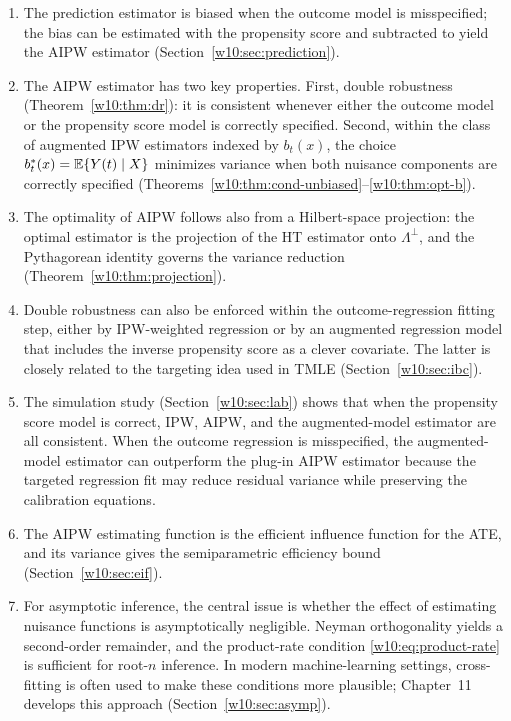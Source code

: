\documentclass[master.tex]{subfiles}
\begin{document}
\begin{enumerate}
  \item The prediction estimator is biased when the outcome model is
    misspecified; the bias can be estimated with the propensity score
    and subtracted to yield the AIPW estimator
    (Section~\ref{w10:sec:prediction}).
  \item The AIPW estimator has two key properties.  First, double
    robustness (Theorem~\ref{w10:thm:dr}): it is consistent whenever
    either the outcome model or the propensity score model is correctly
    specified.  Second, within the class of augmented IPW estimators
    indexed by $b_t(x)$, the choice $b_t^*(x)=\mathbb{E}\{Y(t)\mid X\}$
    minimizes variance when both nuisance components are correctly
    specified (Theorems~\ref{w10:thm:cond-unbiased}--\ref{w10:thm:opt-b}).
  \item The optimality of AIPW follows also from a Hilbert-space
    projection: the optimal estimator is the projection of the HT
    estimator onto $\Lambda^\perp$, and the Pythagorean identity
    governs the variance reduction (Theorem~\ref{w10:thm:projection}).
  \item Double robustness can also be enforced within the
    outcome-regression fitting step, either by IPW-weighted regression
    or by an augmented regression model that includes the inverse
    propensity score as a clever covariate.  The latter is closely
    related to the targeting idea used in TMLE
    \citep{vanderLaan2006targeted} (Section~\ref{w10:sec:ibc}).
  \item The simulation study (Section~\ref{w10:sec:lab}) shows that
    when the propensity score model is correct, IPW, AIPW, and the
    augmented-model estimator are all consistent.  When the outcome
    regression is misspecified, the augmented-model estimator can
    outperform the plug-in AIPW estimator because the targeted
    regression fit may reduce residual variance while preserving the
    calibration equations.
  \item The AIPW estimating function is the efficient influence
    function for the ATE, and its variance gives the semiparametric
    efficiency bound (Section~\ref{w10:sec:eif}).
  \item For asymptotic inference, the central issue is whether the
    effect of estimating nuisance functions is asymptotically
    negligible.  Neyman orthogonality yields a second-order remainder,
    and the product-rate condition \eqref{w10:eq:product-rate} is
    sufficient for root-$n$ inference.  In modern machine-learning
    settings, cross-fitting is often used to make these conditions
    more plausible; Chapter~11 develops this approach
    (Section~\ref{w10:sec:asymp}).
\end{enumerate}
\end{document}
